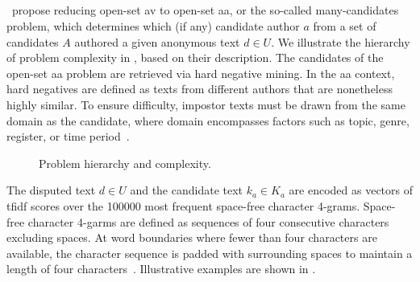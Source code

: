 \subsection{\impApprTitle{}}
\label{sec:impostor_method_theory}

\citet{koppel_determining_2014}\ propose reducing open-set \ac{av} to open-set \ac{aa}, or the so-called many-candidates problem, which determines which (if any) candidate author $a$ from a set of candidates $A$ authored a given anonymous text $d \in U$. 
We illustrate the hierarchy of problem complexity in , based on their description.
The candidates of the open-set \ac{aa} problem are retrieved via hard negative mining. 
In the \ac{aa} context, hard negatives are defined as texts from different authors that are nonetheless highly similar. 
To ensure difficulty, impostor texts must be drawn from the same domain as the candidate, where domain encompasses factors such as topic, genre, register, or time period~\citep{bischoff_importance_2020}. 

\begin{figure}[htbp]
    \centering
    
    \caption[Problem hierarchy and complexity]{Problem hierarchy and complexity.}
    \label{fig:problem_hierarchy}
\end{figure}

The disputed text $d \in U$ and the candidate text $k_a \in K_a$ are encoded as vectors of \ac{tfidf} scores over the \num{100000} most frequent space-free character 4-grams.
Space-free character 4-garms are defined as sequences of four consecutive characters excluding spaces.
At word boundaries where fewer than four characters are available, the character sequence is padded with surrounding spaces to maintain a length of four characters~\citep{koppel_authorship_2011,neal_surveying_2018}. 
Illustrative examples are shown in .

